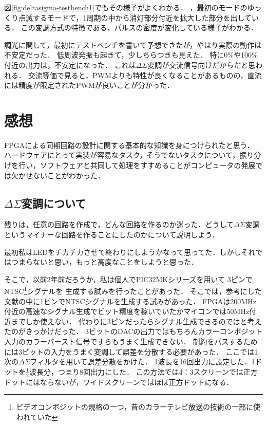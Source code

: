 図\ref{fig:deltasigma-testbench1}でもその様子がよくわかる．
，最初のモードのゆっくり点滅するモードで，1周期の中から消灯部分付近を拡大した部分を出している．
この変調方式の特徴である，パルスの密度が変化している様子がわかる．

調光に関して，最初にテストベンチを書いて予想できたが，やはり実際の動作は不安定だった．
低周波発振も起きて，少しちらつきも見えた．
特に0\%や100\%付近の出力は，不安定になった．
これは$\Delta\Sigma$変調が交流信号向けだからだと思われる．
交流等価で見ると，PWMよりも特性が良くなることがあるものの，直流には精度が限定されたPWMが良いことが分かった．


\clearpage
\section{感想}
FPGAによる同期回路の設計に関する基本的な知識を身につけられたと思う．
ハードウェアにとって実装が容易なタスク，そうでないタスクについて，振り分けを行い，ソフトウェアと共同して処理をすすめることがコンピュータの発展では欠かせないことがわかった．

\subsection{$\Delta\Sigma$変調について}
残りは，任意の回路を作成で，どんな回路を作るのか迷った．どうして$\Delta\Sigma$変調というマイナーな回路を作ることにしたのかについて説明しよう．

最初私はLEDをチカチカさせて終わりにしようかなって思ってた．しかしそれではつまらないと思い，もっと高度なことをしようと思った．

そこで，以前2年前だろうか，私は個人でPIC32MKシリーズを用いて
3ピンでNTSC\footnote{ビデオコンボジットの規格の一つ，昔のカラーテレビ放送の技術の一部に使われていた}シグナルを
生成する試みを行ったことがあった．
そこでは，参考にした文献の中に1ピンでNTSCシグナルを生成する試みがあった．
FPGAは200MHz付近の高速なシグナル生成でビット精度を稼いでいたがマイコンでは50MHz付近までしか使えない．
代わりに3ピンだったらシグナル生成できるのではと考えたのがきっかけだった．
3ビットのDACの出力ではもちろんカラーコンボジット入力のカラーバースト信号ですらもうまく生成できない．
制約をパスするためには3ビットの入力をうまく変調して誤差を分散する必要があった．
ここでは1次の$\Delta\Sigma$フィルタを用いて誤差分散をかけた．
1波長を16回出力に設定した．1ドットを$\frac{1}{2}$波長分，つまり8回出力にした．
この方法では4：3スクリーンでは正方ドットにはならないが，ワイドスクリーンではほぼ正方ドットになる．

